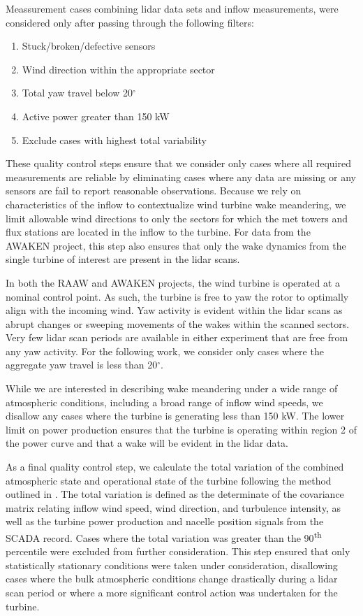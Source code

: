 \documentclass[%
 aip,
 amsmath,
 amssymb,
preprint,%
]{revtex4-2}
\begin{document}
Meassurement cases combining lidar data sets and inflow measurements,  were considered only after passing through the following filters:
\begin{enumerate}
    \item Stuck/broken/defective sensors
    \item Wind direction within the appropriate sector
    \item Total yaw travel below 20$^\circ$
    \item Active power greater than 150 kW
    \item Exclude cases with highest total variability
\end{enumerate}
These quality control steps ensure that we consider only cases where all required measurements are reliable by eliminating cases where any data are missing or any sensors are fail to report reasonable observations. 
Because we rely on characteristics of the inflow to contextualize wind turbine wake meandering, we limit allowable wind directions to only the sectors for which the met towers and flux stations are located in the inflow to the turbine. For data from the AWAKEN project, this step also ensures that only the wake dynamics from the single turbine of interest are present in the lidar scans.

In both the RAAW and AWAKEN projects, the wind turbine is operated at a nominal control point. As such, the turbine is free to yaw the rotor to optimally align with the incoming wind. 
Yaw activity is evident within the lidar scans as abrupt changes or sweeping movements of the wakes within the scanned sectors. 
Very few lidar scan periods are available in either experiment that are free from any yaw activity. 
For the following work, we consider only cases where the aggregate yaw travel is less than 20$^\circ$.

While we are interested in describing wake meandering under a wide range of atmospheric conditions, including a broad range of inflow wind speeds, we disallow any cases where the turbine is generating less than 150 kW. 
The lower limit on power production ensures that the turbine is operating within region 2 of the power curve and that a wake will be evident in the lidar data.

As a final quality control step, we calculate the total variation of the combined atmospheric state and operational state of the turbine following the method outlined in \citet{hamilton2020atmospheric}. 
The total variation is defined as the determinate of the covariance matrix relating inflow wind speed, wind direction, and turbulence intensity, as well as the turbine power production and nacelle position signals from the SCADA record. 
Cases where the total variation was greater than the 90\textsuperscript{th} percentile were excluded from further consideration.
This step ensured that only statistically stationary conditions were taken under consideration, disallowing cases where the bulk atmospheric conditions change drastically during a lidar scan period or where a more significant control action was undertaken for the turbine.
\end{document}
